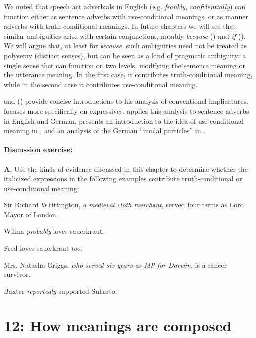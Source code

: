 We noted that speech act adverbials in English (e.g. \textit{frankly}, \textit{confidentially}) can function either as sentence adverbs with use-conditional meanings, or as manner adverbs with truth-conditional meanings. In future chapters we will see that similar ambiguities arise with certain conjunctions, notably \textit{because} () and \textit{if} (). We will argue that, at least for \textit{because}, such ambiguities need not be treated as polysemy (distinct senses), but can be seen as a kind of pragmatic ambiguity: a single sense that can function on two levels, modifying the sentence meaning or the utterance meaning. In the first case, it contributes truth-conditional meaning, while in the second case it contributes use-conditional meaning.



\furtherreading



\citet{Potts2007a,Potts2007b} and (\citeyear{Potts2012}) provide concise introductions to his analysis of conventional implicatures. \citet{Potts2007c} focuses more specifically on expressives. \citet{Scheffler2013} applies this analysis to sentence adverbs in English and German. \citet{Gutzman2015} presents an introduction to the idea of use-conditional meaning in , and an analysis of the German “modal particles” in .


\subsubsection{Discussion exercise:}\label{sec:}

\textbf{A.} Use the kinds of evidence discussed in this chapter to determine whether the italicized expressions in the following examples contribute truth-conditional or use-conditional meaning:

\ea
\ea Sir Richard Whittington, \textit{a medieval cloth merchant}, served four terms as Lord Mayor of London.

\ex Wilma \textit{probably} loves sauerkraut.

\ex Fred loves sauerkraut \textit{too}.

\ex Mrs. Natasha Griggs, \textit{who served six years as MP for Darwin}, is a cancer survivor.

\ex Baxter \textit{reportedly} supported Suharto.
\z
\z

\chapter{{12}: How meanings are composed}


